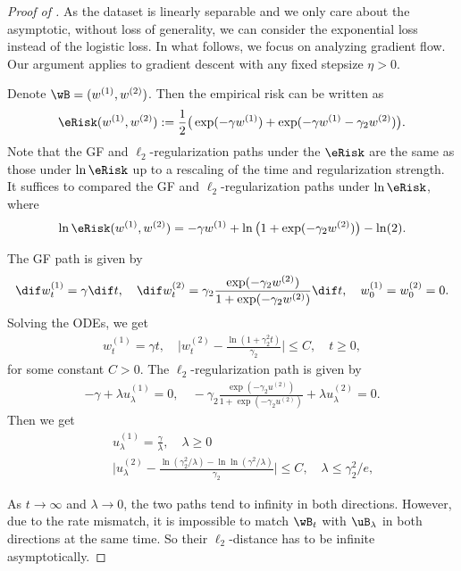 \documentclass[11pt]{article}
\begin{document}
\begin{proof}[Proof of ]
As the dataset is linearly separable and we only care about the asymptotic, without loss of generality, we can consider the exponential loss instead of the logistic loss.
In what follows, we focus on analyzing gradient flow. Our argument applies to gradient descent with any fixed stepsize $\eta>0$.

Denote $\wB = (w^{(1)}, w^{(2)})$. Then the empirical risk can be written as 
\begin{align*}
    \eRisk(w^{(1)}, w^{(2)}):= \frac{1}{2} \big( \exp(-\gamma w^{(1)}) + \exp(-\gamma w^{(1)} - \gamma_2  w^{(2)}) \big).
\end{align*}
Note that the GF and $\ell_2$-regularization paths under the $\eRisk$ are the same as those under $\ln\eRisk$ up to a rescaling of the time and regularization strength.
It suffices to compared the GF and $\ell_2$-regularization paths under $\ln\eRisk$, where
\begin{align*}
    \ln\eRisk(w^{(1)}, w^{(2)}) = -\gamma w^{(1)} + \ln \big(1+\exp(-\gamma_2 w^{(2)}) \big) - \ln(2).
\end{align*}


The GF path is given by
\begin{align*}
    \dif w^{(1)}_t = \gamma \dif t,\quad 
    \dif w^{(2)}_t= \gamma_2 \frac{\exp(-\gamma_2 w^{(2)})}{1+\exp(-\gamma_2 w^{(2)})} \dif t,\quad w^{(1)}_0 = w^{(2)}_0= 0 .
\end{align*}
Solving the ODEs, we get 
\begin{align*}
    w^{(1)}_t = \gamma t,\quad 
    \bigg| w^{(2)}_t - \frac{\ln (1+\gamma_2^2 t)}{\gamma_2} \bigg| \le C,\quad t\ge 0,
\end{align*}
for some constant $C>0$.
The $\ell_2$-regularization path is given by 
\begin{align*}
   -\gamma + \lambda u^{(1)}_\lambda  = 0,\quad 
   -\gamma_2 \frac{\exp(-\gamma_2 u^{(2)})}{1+\exp(-\gamma_2 u^{(2)})} +  \lambda u^{(2)}_\lambda  = 0.
\end{align*}
Then we get 
\begin{align*}
     & u^{(1)}_{\lambda} = \frac{\gamma}{\lambda},\quad  \lambda \ge 0 \\
     \quad 
    & \bigg| u^{(2)}_{\lambda} - \frac{\ln (\gamma_2^2/ \lambda) - \ln\ln(\gamma^2/ \lambda)}{\gamma_2} \bigg| \le C,\quad \lambda\le \gamma^2_2/e,
\end{align*}

As $t \to \infty$ and $\lambda\to 0$, the two paths tend to infinity in both directions. However, due to the rate mismatch, it is impossible to match $\wB_t$ with $\uB_{\lambda}$ in both directions at the same time. So their $\ell_2$-distance has to be infinite asymptotically.  
\end{proof}
\end{document}
